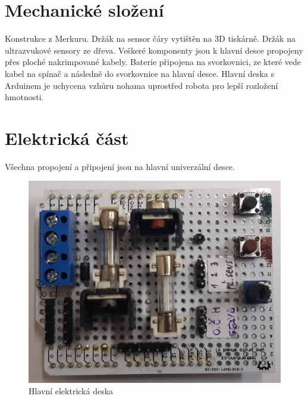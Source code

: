 \documentclass[12pt]{article}
\begin{document}
\section{Mechanické složení}
Konstrukce z Merkuru. Držák na sensor čáry vytištěn na 3D tiskárně. Držák na ultrazvukové sensory ze dřeva. Veškeré komponenty jsou k hlavní desce propojeny přes ploché nakrimpované kabely. Baterie připojena na svorkovnici, ze které vede kabel na spínač a následně do svorkovnice na hlavní desce. Hlavní deska s Arduinem je uchycena vzhůru nohama uprostřed robota pro lepší rozložení hmotnosti.

\section{Elektrická část}
Všechna propojení a připojení jsou na hlavní univerzální desce.
\begin{figure}[h]
	\centering
	\includegraphics[scale=0.15]{deska.jpg}	
	\caption{Hlavní elektrická deska}
	\label{1}
\end{figure}
\end{document}
